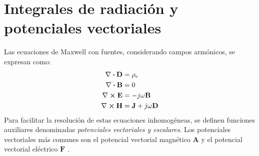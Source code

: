 
\section{Integrales de radiación y potenciales vectoriales}
\label{sec_fundamentos_integrales}

Las ecuaciones de Maxwell con fuentes, considerando campos armónicos, se expresan como:
\begin{align}
\nabla\boldsymbol{\cdot}\mathbf{D} &= \rho_e
\label{ec_fundamentos:1}\\
\nabla\boldsymbol{\cdot}\mathbf{B} &= 0
\label{ec_fundamentos:2}\\
\nabla\boldsymbol{\times}\mathbf{E} &= - j\omega\mathbf{B}
\label{ec_fundamentos:3}\\
\nabla\boldsymbol{\times}\mathbf{H} &= \mathbf{J} + j\omega\mathbf{D}
\label{ec_fundamentos:4}
\end{align}
Para facilitar la resolución de estas ecuaciones inhomogéneas, se definen funciones auxiliares denominadas \emph{potenciales vectoriales y escalares}. Los potenciales vectoriales más comunes son el potencial vectorial magnético $\mathbf{A}$ y el potencial vectorial eléctrico $\mathbf{F}$ \cite{Balanisantenas}.

